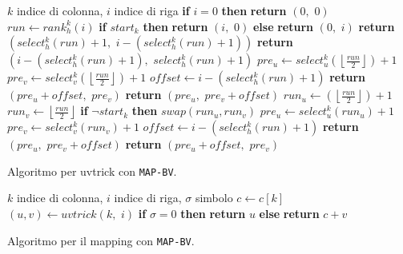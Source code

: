 \begin{algorithm}
  \begin{algorithmic}[1]
    \Comment $k$ indice di colonna, $i$ indice di riga
    \State \textbf{if} $i=0$ \textbf{then}  \textbf{return} $(0,\,\,0)$
    \State $run \gets rank_h^{k}(i)$
    \State \textbf{if} $start_k$ \textbf{then} \textbf{return} $(i,\,\, 0)$
    \textbf{else} \textbf{return} $(0, \,\,i)$
    \State \textbf{return} $(select_h^{k}(run)+1,\,\, i-(select_h^{k}(run)+1))$
    \Else
    \State \textbf{return} $(i-(select_h^{k}(run)+1),\,\, select_h^{k}(run)+1)$
    \EndIf
    \Else
    \State $pre_u\gets
    select_u^{k}\left(\left\lfloor\frac{run}{2}\right\rfloor\right)+1$ 
    \State $pre_v\gets
    select_v^{k}\left(\left\lfloor\frac{run}{2}\right\rfloor\right)+1$ 
    \State $offset \gets i -(select_h^{k}(run)+1)$
    \State \textbf{return} $(pre_u+offset,\,\, pre_v)$
    \Else
    \State \textbf{return} $(pre_u, \,\,pre_v+offset)$
    \EndIf
    \Else
    \State $run_u\gets \left(\left\lfloor\frac{run}{2}\right\rfloor\right)+1$
    \State $run_v\gets \left\lfloor\frac{run}{2}\right\rfloor$
    \State \textbf{if} $\neg start_k$ \textbf{then} $swap(run_u, run_v)$
    \State $pre_u\gets select_u^{k}(run_u)+1$
    \State $pre_v\gets select_v^{k}(run_v)+1$
    \State $offset \gets i -(select_h^{k}(run)+1)$
    \State \textbf{return} $(pre_u, \,\,pre_v+offset)$
    \Else
    \State \textbf{return} $(pre_u+offset, \,\,pre_v)$
    \EndIf
    \EndIf
    \EndIf
    \EndFunction
  \end{algorithmic}
  \caption{Algoritmo per uvtrick con \texttt{MAP-BV}.}
  \label{algo:uvbv}
\end{algorithm}
\begin{algorithm}
  \begin{algorithmic}[1]
    \Comment $k$ indice di colonna, $i$ indice di riga, $\sigma$ simbolo
    \State $c\gets c[k]$
    \State $(u, v) \gets uvtrick(k,\,\,i)$
    \State \textbf{if} $\sigma = 0$ \textbf{then} \textbf{return} $u$
    \textbf{else}  \textbf{return} $c+v$
    \EndFunction
  \end{algorithmic}
  \caption{Algoritmo per il mapping con \texttt{MAP-BV}.}
  \label{algo:lfr}
\end{algorithm}
